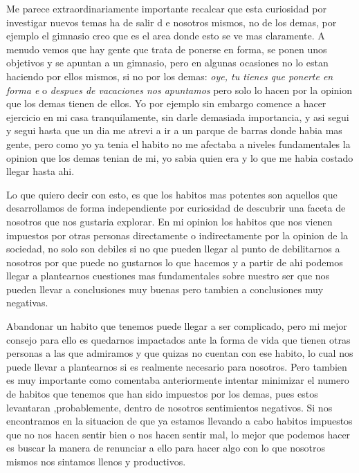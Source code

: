 Me parece extraordinariamente importante recalcar que esta curiosidad por investigar nuevos temas ha de salir d e nosotros mismos, no de los demas, por ejemplo el gimnasio creo que es el area donde esto se ve mas claramente. A menudo vemos que hay gente que trata de ponerse en forma, se ponen unos objetivos y se apuntan a un gimnasio, pero en algunas ocasiones no lo estan haciendo por ellos mismos, si no por los demas: \textit{oye, tu tienes que ponerte en forma e} o \textit{despues de vacaciones nos apuntamos} pero solo lo hacen por la opinion que los demas tienen de ellos. Yo por ejemplo sin embargo comence a hacer ejercicio en mi casa tranquilamente, sin darle demasiada importancia, y asi segui y segui hasta que un dia me atrevi a ir a un parque de barras donde habia mas gente, pero como yo ya tenia el habito no me afectaba a niveles fundamentales la opinion que los demas tenian de mi, yo sabia quien era y lo que me habia costado llegar hasta ahi.

Lo que quiero decir con esto, es que los habitos mas potentes son aquellos que desarrollamos de forma independiente por curiosidad de descubrir una faceta de nosotros que nos gustaria explorar. En mi opinion los habitos que nos vienen impuestos por otras personas directamente o indirectamente por la opinion de la sociedad, no solo son debiles si no que pueden llegar al punto de debilitarnos a nosotros por que puede no gustarnos lo que hacemos y a partir de ahi podemos llegar a plantearnos cuestiones mas fundamentales sobre nuestro ser que nos pueden llevar a conclusiones muy buenas pero tambien a conclusiones muy negativas.

Abandonar un habito que tenemos puede llegar a ser complicado, pero mi mejor consejo para ello es quedarnos impactados ante la forma de vida que tienen otras personas a las que admiramos y que quizas no cuentan con ese habito, lo cual nos puede llevar a plantearnos si es realmente necesario para nosotros. Pero tambien es muy importante como comentaba anteriormente intentar minimizar el numero de habitos que tenemos que han sido impuestos por los demas, pues estos levantaran ,probablemente, dentro de nosotros sentimientos negativos. Si nos encontramos en la situacion de que ya estamos llevando a cabo habitos impuestos que no nos hacen sentir bien o nos hacen sentir mal, lo mejor que podemos hacer es buscar la manera de renunciar a ello para hacer algo con lo que nosotros mismos nos sintamos llenos y productivos.

